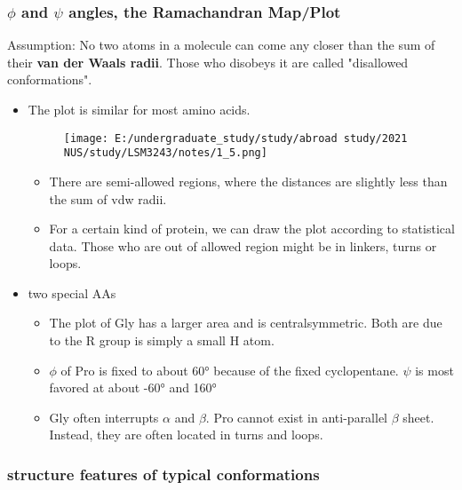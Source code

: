 \hypertarget{and--angles-the-ramachandran-mapplot}{%
	\subsubsection{\texorpdfstring{\(\phi\) and \(\psi\) angles, the
			Ramachandran
			Map/Plot}{\textbackslash{}phi and \textbackslash{}psi angles, the Ramachandran Map/Plot}}\label{and--angles-the-ramachandran-mapplot}}

Assumption: No two atoms in a molecule can come any closer than the sum
of their \textbf{van der Waals radii}. Those who disobeys it are called
"disallowed conformations".

\begin{itemize}
	\item
	The plot is similar for most amino acids.
	
	\begin{figure}
		\centering
		\texttt{[image: E:/undergraduate\_study/study/abroad study/2021 NUS/study/LSM3243/notes/1\_5.png]}
	\end{figure}
	
	\begin{itemize}
		\item
		There are semi-allowed regions, where the distances are slightly
		less than the sum of vdw radii. 
		\item
		For a certain kind of protein, we can draw the plot according to
		statistical data. Those who are out of allowed region might be in
		linkers, turns or loops.
	\end{itemize}
	\item
	two special AAs
	
	\begin{itemize}
		\item
		The plot of Gly has a larger area and is centralsymmetric. Both are
		due to the R group is simply a small H atom.
		\item
		\(\phi\) of Pro is fixed to about 60° because of the fixed
		cyclopentane. \(\psi\) is most favored at about \ang{-60} and \ang{160}
		\item
		Gly often interrupts \(\alpha\) and \(\beta\). Pro cannot exist in
		anti-parallel \(\beta\) sheet. Instead, they are often located in
		turns and loops.
	\end{itemize}
\end{itemize}

\hypertarget{structure-features-of-typical-conformations}{%
	\subsubsection{structure features of typical
		conformations}\label{structure-features-of-typical-conformations}}

